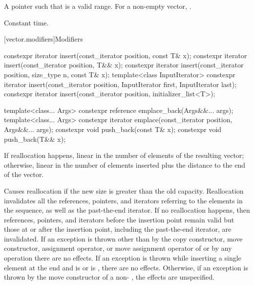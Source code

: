 \begin{itemdescr}
\pnum
\returns
A pointer such that  is a valid range. For a
non-empty vector,  \tcode{==} .

\pnum
\complexity
Constant time.
\end{itemdescr}

[vector.modifiers]{Modifiers}

%
\begin{itemdecl}
constexpr iterator insert(const_iterator position, const T& x);
constexpr iterator insert(const_iterator position, T&& x);
constexpr iterator insert(const_iterator position, size_type n, const T& x);
template<class InputIterator>
  constexpr iterator insert(const_iterator position, InputIterator first, InputIterator last);
constexpr iterator insert(const_iterator position, initializer_list<T>);

template<class... Args> constexpr reference emplace_back(Args&&... args);
template<class... Args> constexpr iterator emplace(const_iterator position, Args&&... args);
constexpr void push_back(const T& x);
constexpr void push_back(T&& x);
\end{itemdecl}

\begin{itemdescr}
\pnum
\complexity
If reallocation happens,
linear in the number of elements of the resulting vector;
otherwise,
linear in the number of elements inserted plus the distance
to the end of the vector.

\pnum
\remarks
Causes reallocation if the new size is greater than the old capacity.
Reallocation invalidates all the references, pointers, and iterators
referring to the elements in the sequence, as well as the past-the-end iterator.
If no reallocation happens, then
references, pointers, and iterators
before the insertion point remain valid
but those at or after the insertion point,
including the past-the-end iterator,
are invalidated.
If an exception is thrown other than by
the copy constructor, move constructor,
assignment operator, or move assignment operator of
 or by any  operation
there are no effects.
If an exception is thrown while inserting a single element at the end and
 is  or 
is , there are no effects.
Otherwise, if an exception is thrown by the move constructor of a non-
, the effects are unspecified.
\end{itemdescr}


